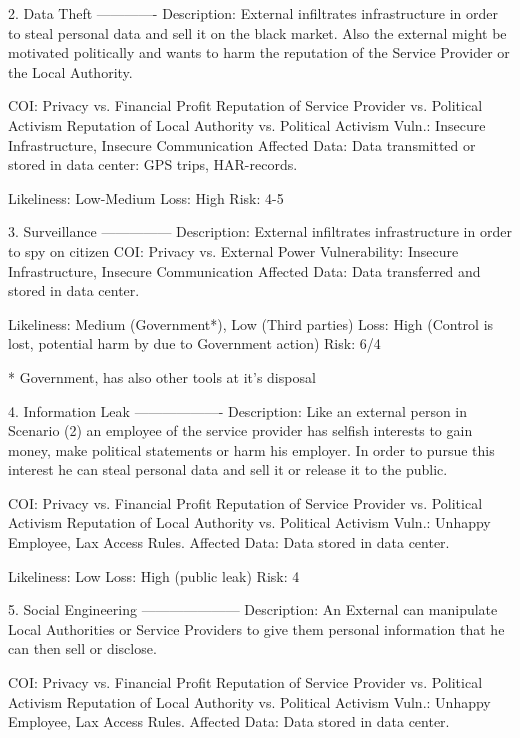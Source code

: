 2. Data Theft
-------------
Description: External infiltrates infrastructure in order to steal personal data and sell it on the black market. Also the external might be motivated politically and wants to harm the reputation of the Service Provider or the Local Authority.

COI:         Privacy vs. Financial Profit
             Reputation of Service Provider vs. Political Activism
             Reputation of Local Authority vs. Political Activism
Vuln.:       Insecure Infrastructure, Insecure Communication
Affected Data:  Data transmitted or stored in data center: GPS trips, HAR-records.

Likeliness: Low-Medium
Loss: High
Risk: 4-5

3. Surveillance
---------------
Description:   External infiltrates infrastructure in order to spy on citizen
COI:           Privacy vs. External Power
Vulnerability: Insecure Infrastructure, Insecure Communication
Affected Data:         Data transferred and stored in data center.

Likeliness: Medium (Government*), Low (Third parties)
Loss: High (Control is lost, potential harm by due to Government action)
Risk:      6/4

* Government, has also other tools at it's disposal


4. Information Leak
-------------------
Description: Like an external person in Scenario (2) an employee of the service provider has selfish interests to gain money, make political statements or harm his employer.
In order to pursue this interest he can steal personal data and sell it or release it to the public.

COI:         Privacy vs. Financial Profit
             Reputation of Service Provider vs. Political Activism
             Reputation of Local Authority vs. Political Activism
Vuln.:       Unhappy Employee, Lax Access Rules.
Affected Data:       Data stored in data center.

Likeliness: Low
Loss: High (public leak)
Risk: 4

5. Social Engineering
---------------------
Description: An External can manipulate Local Authorities or Service Providers to give them personal information that he can then sell or disclose.

COI:         Privacy vs. Financial Profit
             Reputation of Service Provider vs. Political Activism
             Reputation of Local Authority vs. Political Activism
Vuln.:       Unhappy Employee, Lax Access Rules.
Affected Data:       Data stored in data center.

